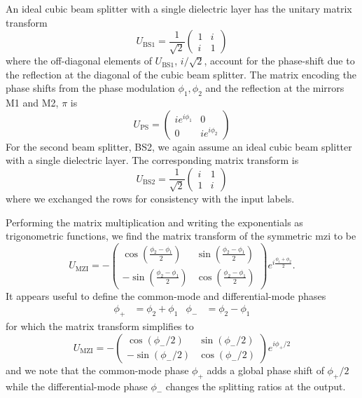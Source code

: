 An ideal cubic beam splitter with a single dielectric layer has the unitary matrix transform~\cite[p.~139]{Gerry2005}
\begin{equation}
	U_\text{BS1}
	=
	\frac{1}{\sqrt{2}}
	\begin{pmatrix}
		1 & i \\
		i & 1
	\end{pmatrix}
\end{equation}
where the off-diagonal elements of $U_\text{BS1}$, $i/\sqrt{2}$, account for the phase-shift due to the reflection at the diagonal of the cubic beam splitter.
The matrix encoding the phase shifts from the phase modulation $\phi_1,\phi_2$ and the reflection at the mirrors M1 and M2, $\pi$ is
\begin{equation}
	U_\text{PS}
	=
	\begin{pmatrix}
		ie^{i\phi_1} & 0 \\
		0 & ie^{i\phi_2}
	\end{pmatrix}
\end{equation}
For the second beam splitter, BS2, we again assume an ideal cubic beam splitter with a single dielectric layer.
The corresponding matrix transform is
\begin{equation}
	U_\text{BS2}
	=
	\frac{1}{\sqrt{2}}
	\begin{pmatrix}
		i & 1 \\
		1 & i
	\end{pmatrix}	
\end{equation}
where we exchanged the rows for consistency with the input labels.

Performing the matrix multiplication and writing the exponentials as trigonometric functions, we find the matrix transform of the symmetric \gls{mzi} to be
\begin{equation}
	U_\text{MZI}
	=
	-
	\begin{pmatrix}
		\cos(\frac{\phi_2-\phi_1}{2}) & \sin(\frac{\phi_2-\phi_1}{2}) \\
		-\sin(\frac{\phi_2-\phi_1}{2}) & \cos(\frac{\phi_2-\phi_1}{2})
	\end{pmatrix}
	e^{i\frac{\phi_1+\phi_2}{2}}
	.
\end{equation}
It appears useful to define the common-mode and differential-mode phases
\begin{align}
	\phi_+
	&=
	\phi_2
	+
	\phi_1
	&
	\phi_-
	&=
	\phi_2-\phi_1
\end{align}
for which the matrix transform simplifies to
\begin{equation}
	U_\text{MZI}
	=
	-
	\begin{pmatrix}
		\cos(\phi_-/2) & \sin(\phi_-/2) \\
		-\sin(\phi_-/2) & \cos(\phi_-/2)
	\end{pmatrix}
	e^{i\phi_+/2}
\end{equation}
and we note that the common-mode phase $\phi_+$ adds a global phase shift of $\phi_+/2$ while the differential-mode phase $\phi_-$ changes the splitting ratios at the output.

